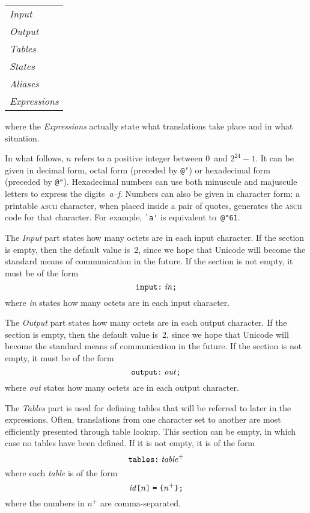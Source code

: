 \documentclass[fleqn]{article}
\newcommand{\mymathtt}[1]{\mbox{\texttt{#1}}}
\newcommand{\mymathit}[1]{\mbox{\emph{#1}}}
\begin{document}
\begin{tabular}{l}
\emph{Input}\\
\emph{Output}\\
\emph{Tables}\\
\emph{States}\\
\emph{Aliases}\\
\emph{Expressions}\\
\end{tabular}

\noindent
where the \emph{Expressions} actually state what translations take
place and in what situation.

In what follows, $n$ refers to a positive integer between 0~and
$2^{24}-1$. It can be given in decimal form, octal form (preceded by
\texttt{@'}) or hexadecimal form (preceded by \texttt{@"}).
Hexadecimal numbers can use both minuscule and majuscule letters
to express the digits~\emph{a--f}.  Numbers can also be given in
character form:  a printable \textsc{ascii} character, when placed
inside a pair of quotes, generates the \textsc{ascii} code for that
character. For example, \verb|`a'| is equivalent to~\verb|@"61|.

The \emph{Input} part states how many octets are in each input character.
If the section is empty, then the default value is~2, since we hope 
that Unicode will become the standard means of communication in the future.
If the section is not empty, it must be of the form
\[ \mymathtt{input:}\;\mymathit{in}\mymathtt{;} \]
where \emph{in} states how many octets are in each input character.

The \emph{Output} part states how many octets are in each output character.
If the section is empty, then the default value is~2, since we hope 
that Unicode will become the standard means of communication in the future.
If the section is not empty, it must be of the form
\[ \mymathtt{output:}\;\mymathit{out}\mymathtt{;} \]
where \emph{out} states how many octets are in each output character.

The \emph{Tables} part is used for defining tables that will be
referred to later in the expressions.  Often, translations from one
character set to another are most efficiently presented through table
lookup.  This section can be empty, in which case no tables have been
defined.  If it is not empty, it is of the form 
\[ \mymathtt{tables:}\; \mymathit{table}^+ \]
where each \emph{table} is of the form
\[ \mymathit{id}\mymathtt{[}n\mymathtt{]}\;\mymathtt{=}\;
\mymathtt{\char'173}n^+\mymathtt{\char'175}\mymathtt{;} \]
where the numbers in $n^+$ are comma-separated.
\end{document}
